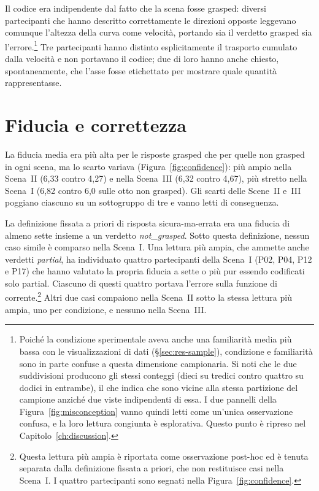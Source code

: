 Il codice era indipendente dal fatto che la scena fosse grasped: diversi partecipanti che hanno descritto correttamente le direzioni opposte leggevano comunque l'altezza della curva come velocità, portando sia il verdetto grasped sia l'errore.\footnote{Poiché la condizione sperimentale aveva anche una familiarità media più bassa con le visualizzazioni di dati (\S\ref{sec:res-sample}), condizione e familiarità sono in parte confuse a questa dimensione campionaria. Si noti che le due suddivisioni producono gli stessi conteggi (dieci su tredici contro quattro su dodici in entrambe), il che indica che sono vicine alla stessa partizione del campione anziché due viste indipendenti di essa. I due pannelli della Figura~\ref{fig:misconception} vanno quindi letti come un'unica osservazione confusa, e la loro lettura congiunta è esplorativa. Questo punto è ripreso nel Capitolo~\ref{ch:discussion}.} Tre partecipanti hanno distinto esplicitamente il trasporto cumulato dalla velocità e non portavano il codice; due di loro hanno anche chiesto, spontaneamente, che l'asse fosse etichettato per mostrare quale quantità rappresentasse.

\section{Fiducia e correttezza}
\label{sec:res-confidence}

La fiducia media era più alta per le risposte grasped che per quelle non grasped in ogni scena, ma lo scarto variava (Figura~\ref{fig:confidence}): più ampio nella Scena~II (6,33 contro 4,27) e nella Scena~III (6,32 contro 4,67), più stretto nella Scena~I (6,82 contro 6,0 sulle otto non grasped). Gli scarti delle Scene~II e~III poggiano ciascuno su un sottogruppo di tre e vanno letti di conseguenza.

La definizione fissata a priori di risposta sicura-ma-errata era una fiducia di almeno sette insieme a un verdetto \emph{not\_grasped}. Sotto questa definizione, nessun caso simile è comparso nella Scena~I. Una lettura più ampia, che ammette anche verdetti \emph{partial}, ha individuato quattro partecipanti della Scena~I (P02, P04, P12 e P17) che hanno valutato la propria fiducia a sette o più pur essendo codificati solo partial. Ciascuno di questi quattro portava l'errore sulla funzione di corrente.\footnote{Questa lettura più ampia è riportata come osservazione post-hoc ed è tenuta separata dalla definizione fissata a priori, che non restituisce casi nella Scena~I. I quattro partecipanti sono segnati nella Figura~\ref{fig:confidence}.} Altri due casi compaiono nella Scena~II sotto la stessa lettura più ampia, uno per condizione, e nessuno nella Scena~III.

